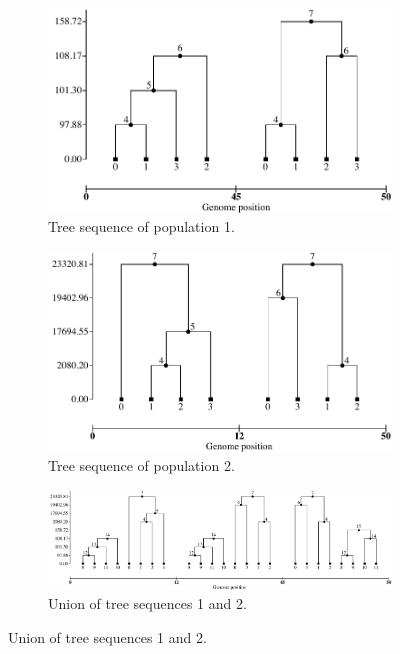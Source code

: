 \begin{figure}
\centering
\begin{minipage}{0.45\textwidth}%
\begin{subfigure}[b]{\linewidth}
\includegraphics[width=\linewidth]{union_example/ts2.pdf}
\caption{Tree sequence of population 1.}\label{fig:ts1}
\end{subfigure}
\end{minipage}
\begin{minipage}{0.45\textwidth}%
\begin{subfigure}[b]{\linewidth}
\includegraphics[width=\linewidth]{union_example/ts1.pdf}
\caption{Tree sequence of population 2.}\label{fig:ts2}
\end{subfigure}
\end{minipage}

\begin{subfigure}[b]{.9\textwidth}
\includegraphics[width=\linewidth]{union_example/tsu.pdf}
\caption{Union of tree sequences 1 and 2.}\label{fig:tsu}
\end{subfigure}


\end{figure}
